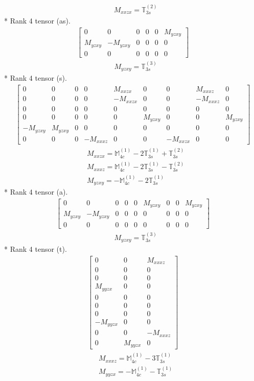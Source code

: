 \documentclass[fleqn,8pt,landscape]{jsarticle}
\begin{document}
\begin{align*}
& M_{xxzx} = \mathbb{T}_{3s}^{(2)}
\end{align*}
* Rank 4 tensor (as).
\begin{align*}
\begin{bmatrix} 0 & 0 & 0 & 0 & 0 & M_{yzxy} \\ M_{yzxy} & - M_{yzxy} & 0 & 0 & 0 & 0 \\ 0 & 0 & 0 & 0 & 0 & 0 \end{bmatrix}
\end{align*}
\begin{align*}
& M_{yzxy} = \mathbb{T}_{3s}^{(3)}
\end{align*}
* Rank 4 tensor (s).
\begin{align*}
\begin{bmatrix} 0 & 0 & 0 & 0 & M_{xxzx} & 0 & 0 & M_{xxxz} & 0 \\ 0 & 0 & 0 & 0 & - M_{xxzx} & 0 & 0 & - M_{xxxz} & 0 \\ 0 & 0 & 0 & 0 & 0 & 0 & 0 & 0 & 0 \\ 0 & 0 & 0 & 0 & 0 & M_{yzxy} & 0 & 0 & M_{yzxy} \\ - M_{yzxy} & M_{yzxy} & 0 & 0 & 0 & 0 & 0 & 0 & 0 \\ 0 & 0 & 0 & - M_{xxxz} & 0 & 0 & - M_{xxzx} & 0 & 0 \end{bmatrix}
\end{align*}
\begin{align*}
& M_{xxzx} = \mathbb{M}_{4c}^{(1)} - 2 \mathbb{T}_{3s}^{(1)} + \mathbb{T}_{3s}^{(2)} \\
& M_{xxxz} = \mathbb{M}_{4c}^{(1)} - 2 \mathbb{T}_{3s}^{(1)} - \mathbb{T}_{3s}^{(2)} \\
& M_{yzxy} = - \mathbb{M}_{4c}^{(1)} - 2 \mathbb{T}_{3s}^{(1)}
\end{align*}
* Rank 4 tensor (a).
\begin{align*}
\begin{bmatrix} 0 & 0 & 0 & 0 & 0 & M_{yzxy} & 0 & 0 & M_{yzxy} \\ M_{yzxy} & - M_{yzxy} & 0 & 0 & 0 & 0 & 0 & 0 & 0 \\ 0 & 0 & 0 & 0 & 0 & 0 & 0 & 0 & 0 \end{bmatrix}
\end{align*}
\begin{align*}
& M_{yzxy} = \mathbb{T}_{3s}^{(3)}
\end{align*}
* Rank 4 tensor (t).
\begin{align*}
\begin{bmatrix} 0 & 0 & M_{xxxz} \\ 0 & 0 & 0 \\ 0 & 0 & 0 \\ M_{yyzx} & 0 & 0 \\ 0 & 0 & 0 \\ 0 & 0 & 0 \\ 0 & 0 & 0 \\ - M_{yyzx} & 0 & 0 \\ 0 & 0 & - M_{xxxz} \\ 0 & M_{yyzx} & 0 \end{bmatrix}
\end{align*}
\begin{align*}
& M_{xxxz} = \mathbb{M}_{4c}^{(1)} - 3 \mathbb{T}_{3s}^{(1)} \\
& M_{yyzx} = - \mathbb{M}_{4c}^{(1)} - \mathbb{T}_{3s}^{(1)}
\end{align*}
\end{document}
